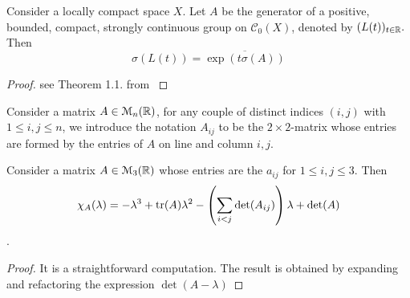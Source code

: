 \begin{theorem} 
	Consider a locally compact space $X$. Let $A$ be the generator of a positive, bounded, compact, strongly continuous group on $\mathcal C_0(X)$, denoted by $(L(t))_{t\in\mathbb{R}}.$ Then
	$$\sigma(L(t)) = \overline{\exp(t \sigma(A))}$$
\end{theorem}

\begin{proof}
	see Theorem 1.1. from \cite{Arendt1984}
\end{proof}


%
%


\begin{definition}
	Consider a matrix $A \in \EuScript{M}_n(\mathbb{R})$, for any couple of distinct indices $(i, j)$ with $1 \le i, j \le n$, we introduce the notation $A_{ij}$ to be the $2 \! \times \! 2$-matrix whose entries are formed by the entries of $A$ on line and column $i, j$.
\end{definition}


\begin{proposition} Consider a matrix $A \in \EuScript{M}_3(\mathbb{R})$ whose entries are the $a_{ij}$ for $1 \le i, j \le 3$. Then 
	$$\chi_A(\lambda) = -\lambda^3 + \mathrm{tr}(A) \lambda^2 - \left( \sum_{i < j} \mathrm{det}(A_{ij})\right) \lambda + \mathrm{det}(A)$$.
\end{proposition}

\begin{proof}
	It is a straightforward computation. The result is obtained by expanding and refactoring the expression $\det(A - \lambda)$
\end{proof}

